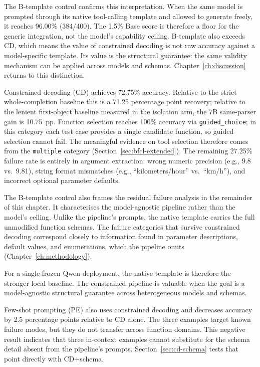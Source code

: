 The B-template control confirms this interpretation. When the same model is
prompted through its native tool-calling template and allowed to generate
freely, it reaches 96.00\% (384/400). The 1.5\% Base score is therefore a
floor for the generic integration, not the model's capability ceiling.
B-template also exceeds CD, which means the value of constrained decoding is
not raw accuracy against a model-specific template. Its value is the structural
guarantee: the same validity mechanism can be applied across models and
schemas. Chapter~\ref{ch:discussion} returns to this distinction.

Constrained decoding (CD) achieves 72.75\% accuracy. Relative to the strict
whole-completion baseline this is a 71.25 percentage point recovery; relative
to the lenient first-object baseline measured in the isolation arm, the 7B
same-parser gain is 10.75~pp. Function selection reaches 100\% accuracy via
\texttt{guided\_choice}; in this category each test case provides a single
candidate function, so guided selection cannot fail. The meaningful evidence
on tool selection therefore comes from the \texttt{multiple} category
(Section~\ref{sec:bfcl-extended}). The remaining 27.25\% failure rate is
entirely in argument extraction: wrong numeric precision (e.g., 9.8 vs.\
9.81), string format mismatches (e.g., ``kilometers/hour'' vs.\ ``km/h''),
and incorrect optional parameter defaults.

The B-template control also frames the residual failure analysis in the
remainder of this chapter. It characterises the model-agnostic pipeline rather
than the model's ceiling. Unlike the pipeline's prompts, the native template
carries the full unmodified function schemas. The failure categories that
survive constrained decoding correspond closely to information found in
parameter descriptions, default values, and enumerations, which the pipeline
omits (Chapter~\ref{ch:methodology}).

For a single frozen Qwen deployment, the native template is therefore the
stronger local baseline. The constrained pipeline is valuable when the goal is a
model-agnostic structural guarantee across heterogeneous models and schemas.

Few-shot prompting (PE) also uses constrained decoding and decreases accuracy by 2.5 percentage points relative to CD alone. The three examples target known failure modes, but they do not transfer across function domains. This negative result indicates that three in-context examples cannot substitute for the schema detail absent from the pipeline's prompts. Section~\ref{sec:cd-schema} tests that point directly with CD+schema.

